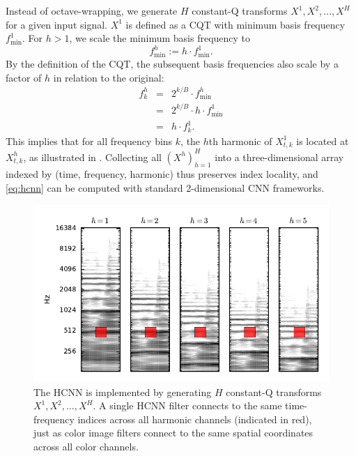 \documentclass{article}
\begin{document}
Instead of octave-wrapping, we generate $H$ constant-Q transforms $X^1, X^2, \dots, X^H$ for a given input signal.
$X^1$ is defined as a CQT with minimum basis frequency $f^1_{\min}$.
For $h > 1$, we scale the minimum basis frequency to
\begin{equation}
    f^h_{\min} := h \cdot f^1_{\min}.\label{eq:fmin}
\end{equation}
By the definition of the CQT, the subsequent basis frequencies also scale by a factor of $h$ in relation to the original:
\begin{eqnarray}
    f^h_k &=& 2^{k/B} \cdot f^h_{\min}\\
        &=& 2^{k/B} \cdot h \cdot f^1_{\min}\\
    &=& h \cdot f^1_k.
\end{eqnarray}
This implies that for all frequency bins $k$, the $h$th harmonic of $X^1_{t, k}$ is located at $X^h_{t, k}$, as illustrated in .
Collecting all ${(X^h)}_{h=1}^H$ into a three-dimensional array indexed by (time, frequency, harmonic) thus preserves index locality, and \cref{eq:hcnn} can be computed with standard 2-dimensional CNN frameworks.


\begin{figure}
    \includegraphics[width=\columnwidth]{figs/hcnn}
    \caption{The HCNN is implemented by generating $H$ constant-Q transforms $X^1, X^2, \ldots, X^H$.
    A single HCNN filter connects to the same time-frequency indices across all harmonic channels (indicated in red), just as color image filters connect to the same spatial coordinates across all color channels.}
\label{fig:hcnn}
\end{figure}
\end{document}
